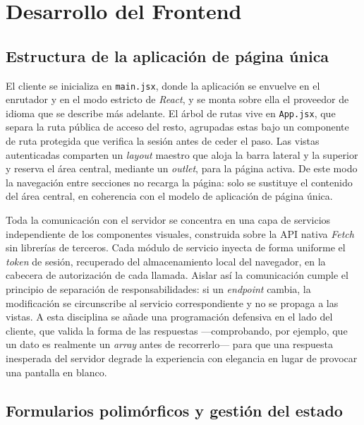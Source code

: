 \documentclass[11pt,oneside,spanish,listoffigures,listoftables]{tfgetsinf}
\begin{document}
\section{Desarrollo del Frontend}

\subsection{Estructura de la aplicación de página única}

El cliente se inicializa en \texttt{main.jsx}, donde la aplicación se envuelve en el enrutador y en el modo estricto de \textit{React}, y se monta sobre ella el proveedor de idioma que se describe más adelante. El árbol de rutas vive en \texttt{App.jsx}, que separa la ruta pública de acceso del resto, agrupadas estas bajo un componente de ruta protegida que verifica la sesión antes de ceder el paso. Las vistas autenticadas comparten un \textit{layout} maestro que aloja la barra lateral y la superior y reserva el área central, mediante un \textit{outlet}, para la página activa. De este modo la navegación entre secciones no recarga la página: solo se sustituye el contenido del área central, en coherencia con el modelo de aplicación de página única.

Toda la comunicación con el servidor se concentra en una capa de servicios independiente de los componentes visuales, construida sobre la API nativa \textit{Fetch} sin librerías de terceros. Cada módulo de servicio inyecta de forma uniforme el \textit{token} de sesión, recuperado del almacenamiento local del navegador, en la cabecera de autorización de cada llamada. Aislar así la comunicación cumple el principio de separación de responsabilidades: si un \textit{endpoint} cambia, la modificación se circunscribe al servicio correspondiente y no se propaga a las vistas. A esta disciplina se añade una programación defensiva en el lado del cliente, que valida la forma de las respuestas —comprobando, por ejemplo, que un dato es realmente un \textit{array} antes de recorrerlo— para que una respuesta inesperada del servidor degrade la experiencia con elegancia en lugar de provocar una pantalla en blanco.

\subsection{Formularios polimórficos y gestión del estado}
\end{document}

